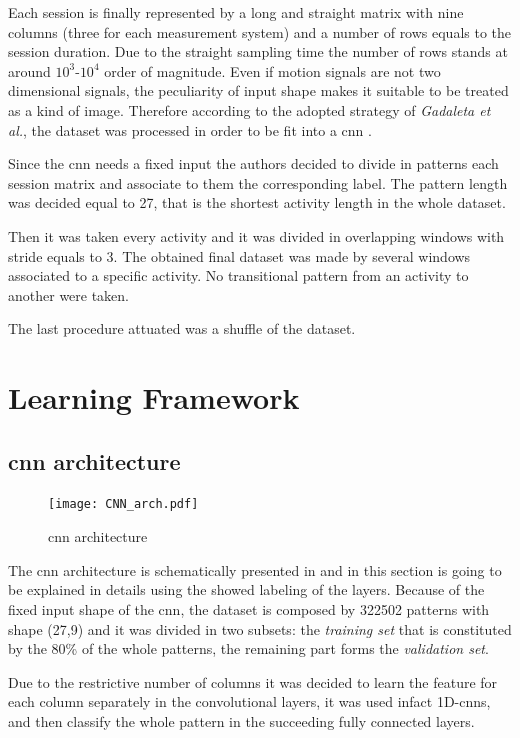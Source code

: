 Each session is finally represented by a long and straight matrix with nine columns (three for each measurement system) and a number of rows equals to the session duration. Due to the straight sampling time the number of rows stands at around $10^3$-$10^4$ order of magnitude. Even if motion signals are not two dimensional signals, the peculiarity of input shape makes it suitable to be treated as a kind of image. Therefore according to the adopted strategy of \textit{Gadaleta et al.}, the dataset was processed in order to be fit into a \gls{cnn} \cite{Gadaleta-2018}.


Since the \gls{cnn} needs a fixed input the authors decided to divide in patterns each session matrix and associate to them the corresponding label. The pattern length was decided equal to 27, that is the shortest activity length in the whole dataset.

Then it was taken every activity and it was divided in overlapping windows with stride equals to 3. The obtained final dataset was made by several windows associated to a specific activity. No transitional pattern from an activity to another were taken.


The last procedure attuated was a shuffle of the dataset.


\section{Learning Framework}
\label{sec:learning_framework}

\subsection{\gls{cnn} architecture}

\begin{figure}[htp]
\texttt{[image: CNN\_arch.pdf]}
\caption{\gls{cnn} architecture}
\label{fig:CNN}
\end{figure}

The \gls{cnn} architecture is schematically presented in  and in this section is going to be explained in details using the showed labeling of the layers.
Because of the fixed input shape of the \gls{cnn}, the dataset is composed by 322502 patterns with shape (27,9) and it was divided in two subsets: the \textit{training set} that is constituted by the 80\% of the whole patterns, the remaining part forms the \textit{validation set}.

Due to the restrictive number of columns it was decided to learn the feature for each column separately in the convolutional layers, it was used infact 1D-\glspl{cnn}, and then classify the whole pattern in the succeeding fully connected layers.

